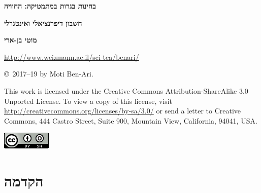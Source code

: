 

\thispagestyle{empty}

\begin{center}
\textbf{\LARGE בחינות בגרות במתמטיקה: החוויה}

\bigskip
\bigskip

\textbf{\LARGE חשבון דיפרנציאלי ואינטגרלי}

\bigskip
\bigskip
\bigskip
\bigskip

\textbf{\Large מוטי בן-ארי}

\bigskip
\bigskip

\url{http://www.weizmann.ac.il/sci-tea/benari/}
\end{center}



\vfill


\begin{footnotesize}
\begin{center}
\copyright{}\ 2017--19 by Moti Ben-Ari.
\end{center}

This work is licensed under the Creative Commons Attribution-ShareAlike 3.0 Unported License. To view a copy of this license, visit \url{http://creativecommons.org/licenses/by-sa/3.0/} or send a letter to Creative Commons, 444 Castro Street, Suite 900, Mountain View, California, 94041, USA.
\end{footnotesize}

\bigskip

\begin{center}
\includegraphics[width=.15\textwidth]{../../by-sa.png}
\end{center}

\np
\thispagestyle{empty}
\mbox{}
\np
\thispagestyle{empty}

\tableofcontents
\np

\section*{הקדמה}

